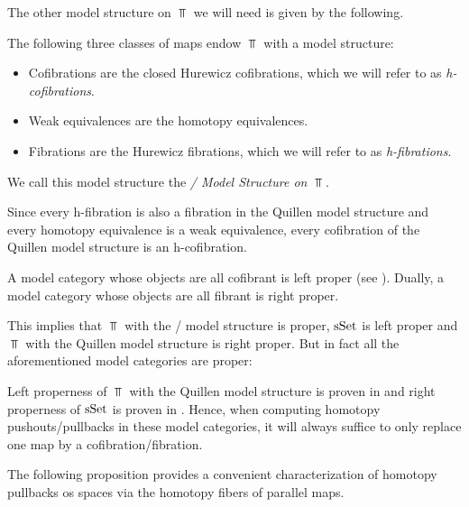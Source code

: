 The other model structure on $\Top$ we will need is given by the following.
\begin{thm}\label{thm:stromModelStructure}
    The following three classes of maps endow $\Top$ with a model structure:
    \begin{itemize}
        \item Cofibrations are the closed Hurewicz cofibrations, which we will refer to as \emph{h-cofibrations}.
        \item Weak equivalences are the homotopy equivalences.
        \item Fibrations are the Hurewicz fibrations, which we will refer to as \emph{h-fibrations}.
    \end{itemize}
    We call this model structure the \emph{\Strom/ Model Structure on $\Top$}.
    \begin{reference}
       \cite{Strom1972} %
    \end{reference}
\end{thm}
\begin{remark}
    Since every h-fibration is also a fibration in the Quillen model structure and every homotopy equivalence is a weak equivalence, every cofibration of the Quillen model structure is an h-cofibration. %
\end{remark}
\begin{remark}[Properness] 
    A model category whose objects are all cofibrant is left proper (see \cite[Proposition A.2.4.2]{HTT}).
    Dually, a model category whose objects are all fibrant is right proper.
    
    This implies that $\Top$ with the \Strom/ model structure is proper, $\operatorname{sSet}$ is left proper and $\Top$ with the Quillen model structure is right proper.
    But in fact all the aforementioned model categories are proper:

    Left properness of $\Top$ with the Quillen model structure is proven in \cite[Theorem 13.1.10]{hirschhorn2003model} and right properness of $\operatorname{sSet}$ is proven in \cite[Theorem 13.1.13]{hirschhorn2003model}.
    Hence, when computing homotopy pushouts/pullbacks in these model categories, it will always suffice to only replace one map by a cofibration/fibration.
\end{remark}
The following proposition provides a convenient characterization of homotopy pullbacks os spaces via the homotopy fibers of parallel maps.
